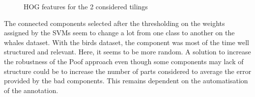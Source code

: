 \documentclass[twoside]{article}
\begin{document}
\begin{multicols}{2}
\begin{figure}[H]
\centering
{}
\quad
{}
\caption{HOG features for the 2 considered tilings}
\label{fig:fig_std}
\end{figure}

The connected components selected after the thresholding on the weights assigned by the SVMs seem to change a lot from one class to another on the whales dataset. With the birds dataset, the component was most of the time well structured and relevant. Here, it seems to be more random. A solution to increase the robustness of the Poof approach even though some components may lack of structure could be to increase the number of parts considered to average the error provided by the bad components. This remains dependent on the automatisation of the annotation.


\end{multicols}
\end{document}

